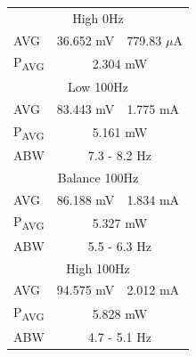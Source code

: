 \begin{figure}[!hbtp]
\begin{minipage}{0.5\textwidth}
\begin{tabular}{|l|l|l|}
      \hline
      \multicolumn{3}{|c|}{High 0Hz}\\
      AVG & 36.652 mV & 779.83 $\mu$A\\
      P\textsubscript{AVG} & \multicolumn{2}{c|}{2.304 mW}\\
      \hline
      \multicolumn{3}{|c|}{Low 100Hz}\\
      AVG & 83.443 mV & 1.775 mA\\
      P\textsubscript{AVG} & \multicolumn{2}{c|}{5.161
       mW}\\
       ABW & \multicolumn{2}{c|}{7.3 - 8.2 Hz}\\
      \hline
      \multicolumn{3}{|c|}{Balance 100Hz}\\
      AVG & 86.188 mV & 1.834 mA\\
      P\textsubscript{AVG} & \multicolumn{2}{c|}{5.327 mW}\\
      ABW & \multicolumn{2}{c|}{5.5 - 6.3 Hz}\\
      \hline
      \multicolumn{3}{|c|}{High 100Hz}\\
      AVG & 94.575 mV & 2.012 mA\\
      P\textsubscript{AVG} & \multicolumn{2}{c|}{5.828 mW}\\
      ABW & \multicolumn{2}{c|}{4.7 - 5.1 Hz}\\
      \hline
    \end{tabular}
    \label{tab:test4}
  \end{minipage}
\end{figure}

